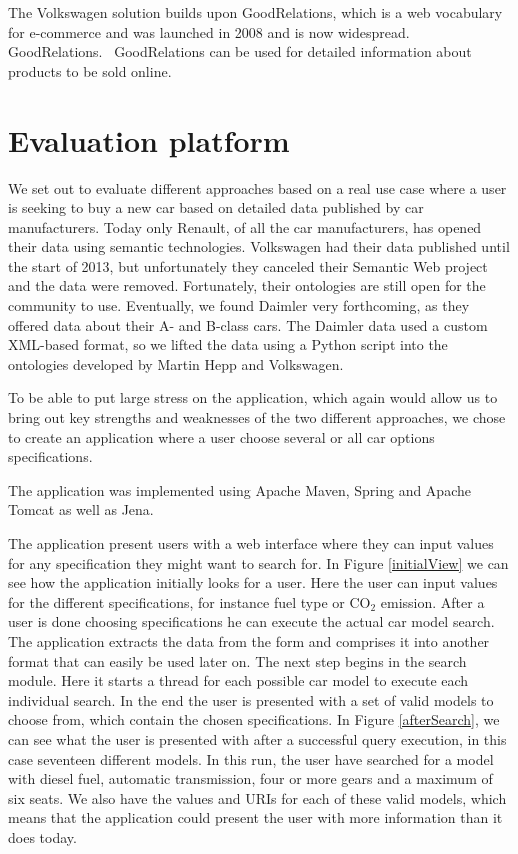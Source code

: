 \documentclass{llncs}
\begin{document}
The Volkswagen solution builds upon GoodRelations, which is a web
vocabulary for e-commerce and was launched in 2008 and is now
widespread. GoodRelations.~\cite{GR} GoodRelations can be used for
detailed information about products to be sold online.


\section{Evaluation platform}

We set out to evaluate different approaches based on a real use case
where a user is seeking to buy a new car based on detailed data
published by car manufacturers. Today only Renault, of all the car
manufacturers, has opened their data using semantic
technologies. Volkswagen had their data published until the start of
2013, but unfortunately they canceled their Semantic Web project and
the data were removed.  Fortunately, their ontologies are still open
for the community to use. Eventually, we found Daimler very
forthcoming, as they offered data about their A- and B-class cars.
The Daimler data used a custom XML-based format, so we lifted the data
using a Python script into the ontologies developed by Martin Hepp and
Volkswagen.

To be able to put large stress on the application, which again would
allow us to bring out key strengths and weaknesses of the two
different approaches, we chose to create an application where a user
choose several or all car options specifications.

The application was implemented using Apache Maven, Spring and Apache
Tomcat as well as Jena.

The application present users with a web interface where they can
input values for any specification they might want to search for.  In
Figure \vref{initialView} we can see how the application initially
looks for a user. Here the user can input values for the different
specifications, for instance fuel type or CO$_2$ emission. After a
user is done choosing specifications he can execute the actual car
model search. The application extracts the data from the form and
comprises it into another format that can easily be used later on. The
next step begins in the search module. Here it starts a thread for
each possible car model to execute each individual search. In the end
the user is presented with a set of valid models to choose from, which
contain the chosen specifications. In Figure \vref{afterSearch}, we
can see what the user is presented with after a successful query
execution, in this case seventeen different models. In this run, the
user have searched for a model with diesel fuel, automatic
transmission, four or more gears and a maximum of six seats. We also
have the values and URIs for each of these valid models, which means
that the application could present the user with more information than
it does today.
\end{document}
